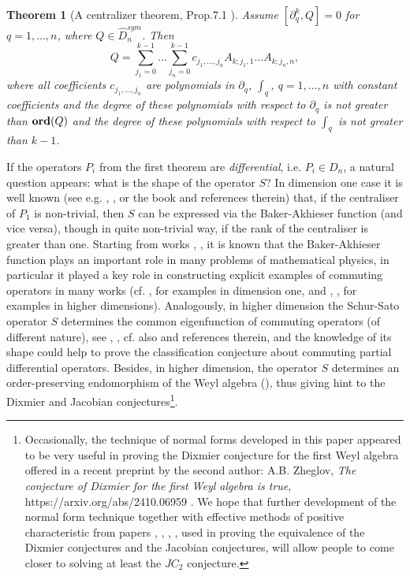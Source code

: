 \documentclass[11pt]{article}
\theoremstyle{definition}
\newcommand{\Ord}{\mathop {\rm \bf ord}}
\theoremstyle{plain}
\newtheorem{theorem}{Theorem}[section]
\numberwithin{equation}{section}
\begin{document}
\begin{theorem}[A centralizer theorem, Prop.7.1 ]
\label{T:centraliser_theorem}
Assume $[\partial_q^{k}, Q]=0$ for $q=1, \ldots , n$, where $Q\in \hat{D}_n^{sym}$. Then 
$$
Q=\sum_{j_{1}=0}^{k-1}\ldots \sum_{j_{n}=0}^{k-1}c_{j_1,\ldots ,j_n}A_{k; j_1,1}\ldots A_{k; j_n,n},
$$
where all coefficients  $c_{j_1,\ldots ,j_n}$ are {\it polynomials} in $\partial_q$, $\int_q$, $q=1,\ldots , n$ with {\it constant} coefficients  and the degree of these polynomials with respect to $\partial_q$ is not greater than $\Ord (Q)$ and the degree of these polynomials with respect to $\int_q$ is not greater than $k-1$.
\end{theorem}

If the operators $P_i$ from the first theorem are {\it differential}, i.e. $P_i\in D_n$, a natural question appears: what is the shape of the operator $S$? In  dimension one case it is well known (see e.g. \cite{Mu}, \cite{Li_Mulase}, \cite{SW} or the book  \cite{Zheglov_book} and references therein) that, if the centraliser of $P_1$ is non-trivial, then  $S$ can be expressed via the Baker-Akhieser function (and vice versa), though in quite non-trivial way, if the rank of the centraliser is greater than one. Starting from works \cite{Kr1}, \cite{Kr2}, \cite{KN} it is known that  the Baker-Akhieser function plays an important role in many problems of mathematical physics, in particular it played a key role in constructing explicit examples of commuting operators in many works (cf. \cite{Mokh}, \cite{M1} for examples in dimension one, and \cite{ChalykhVeselov90}, \cite{ChalykhVeselov98}, \cite{ChalykhFeiginVeselov2} for examples in higher dimensions). Analogously, in higher dimension the  Schur-Sato operator $S$ determines the common eigenfunction of commuting operators (of different nature), see \cite[Sec. 6]{BurbanZheglov2017}, \cite{Zheglov_belovezha}, cf. also \cite{BerestChalykh22} and references therein, and the knowledge of its shape could help to prove the classification conjecture \cite[Conj. 7.11]{Zheglov_belovezha} about commuting partial differential operators. Besides, in higher dimension, the operator $S$ determines an order-preserving endomorphism of the Weyl algebra (\cite[Cor. 2.1]{A.Z}), thus giving hint to the Dixmier and Jacobian conjectures\footnote{ Occasionally, the technique of normal forms developed in this paper appeared to be very useful in proving the Dixmier conjecture for the first Weyl algebra offered in a recent preprint by the second author: A.B. Zheglov, {\it The conjecture of Dixmier for the first Weyl algebra is true}, https://arxiv.org/abs/2410.06959 . We hope that further development of the normal form technique together with effective methods of positive characteristic from papers \cite{BK}, \cite{BK1}, \cite{Ts1}, \cite{Ts2}, used in proving the equivalence of the Dixmier conjectures and the Jacobian conjectures, will allow people to come closer to solving at least the $JC_2$ conjecture. }. 
\end{document}
